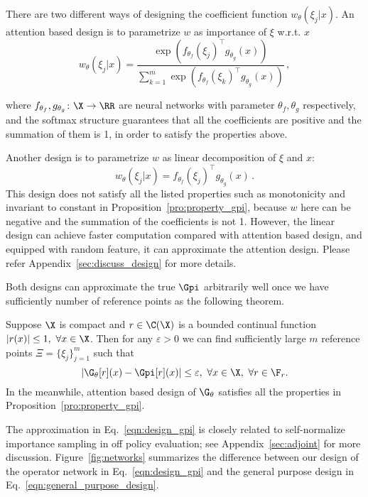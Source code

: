 There are two different ways of 
designing  the coefficient function $w_\theta({\xi_j}|x)$.
An attention based design is to parametrize $w$ as importance of $\xi$  w.r.t. $x$
\begin{equation}\label{eqn:attention_design_gpi}
    w_\theta({\xi_j}|x) = \frac{\exp(f_{\theta_f}(\xi_j)^\top g_{\theta_g}(x))}{\sum_{k=1}^m \exp(f_{\theta_f}(\xi_k)^\top g_{\theta_g}(x))}\,,
\end{equation}

where $f_{\theta_f}, g_{\theta_g}\colon \X \to \RR$ are neural networks with parameter $\theta_f,\theta_g$ respectively, and the softmax structure guarantees that all the coefficients are positive and the summation of them is 1, in order to satisfy the properties above.

Another design is to parametrize $w$ as linear decomposition of $\xi$ and $x$:
\begin{equation}\label{eqn:linear_design_gpi}
    w_\theta({\xi_j}|x) = f_{\theta_f}(\xi_j)^\top g_{\theta_g}(x)\,.
\end{equation}
This design does not satisfy all the listed properties such as monotonicity and invariant to constant in Proposition~\ref{pro:property_gpi}, because $w$ here can be negative and the summation of the coefficients is not 1.
However, the linear design can achieve faster computation compared with attention based design, and equipped with random feature, it can approximate the attention design.
Please refer Appendix~\ref{sec:discuss_design} for more details.

Both designs can approximate the true $\Gpi$ arbitrarily well once we have sufficiently number of reference points as the following theorem.
\begin{thm}\label{thm:approximate_gpi}
Suppose $\X$ is compact and $r\in \C(\X)$ is a bounded continual function $|r(x)|\leq 1,~\forall x\in \X$.
Then for any $\varepsilon > 0$ we can find sufficiently large $m$ reference points $\Xi = \{\xi_j\}_{j=1}^m$ such that 
\begin{equation}
    |\G_\theta[r](x) - \Gpi[r](x)| \leq \varepsilon,~\forall x\in \X, ~\forall r\in \F_r.
\end{equation}
In the meanwhile, attention based design of $\G_\theta$ satisfies all the properties in Proposition~\ref{pro:property_gpi}.
\end{thm}



The approximation in Eq.~\eqref{eqn:design_gpi} is closely related to self-normalize importance sampling 
in off policy evaluation; see Appendix~\ref{sec:adjoint} for more discussion.
Figure~\ref{fig:networks} summarizes the difference between our design of the operator network in Eq.~\eqref{eqn:design_gpi} and the general purpose design in Eq.~\eqref{eqn:general_purpose_design}.

